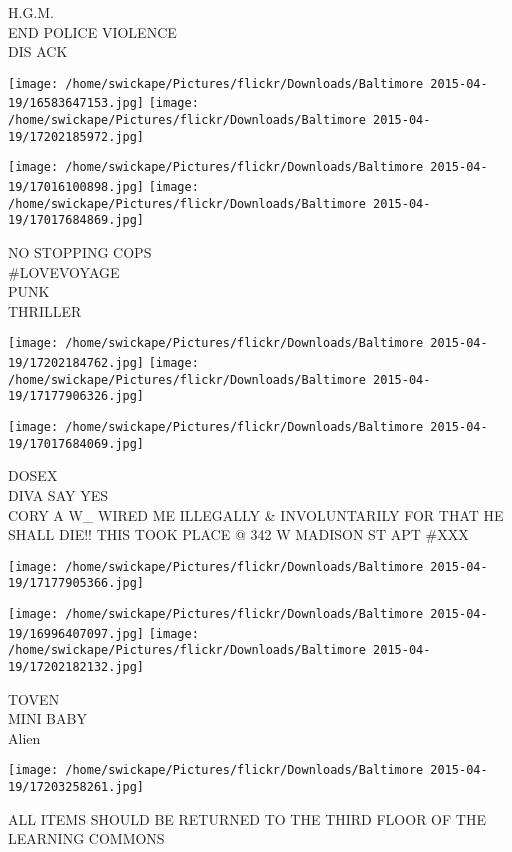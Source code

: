 \documentclass[10pt,letterpaper]{article}
\begin{document}
H.G.M.\\
END POLICE VIOLENCE\\
DIS ACK
\pagebreak

\texttt{[image: /home/swickape/Pictures/flickr/Downloads/Baltimore 2015-04-19/16583647153.jpg]}
\texttt{[image: /home/swickape/Pictures/flickr/Downloads/Baltimore 2015-04-19/17202185972.jpg]}

\texttt{[image: /home/swickape/Pictures/flickr/Downloads/Baltimore 2015-04-19/17016100898.jpg]}
\texttt{[image: /home/swickape/Pictures/flickr/Downloads/Baltimore 2015-04-19/17017684869.jpg]}

NO STOPPING COPS\\
\#LOVEVOYAGE\\
PUNK\\
THRILLER
\pagebreak

\texttt{[image: /home/swickape/Pictures/flickr/Downloads/Baltimore 2015-04-19/17202184762.jpg]}
\texttt{[image: /home/swickape/Pictures/flickr/Downloads/Baltimore 2015-04-19/17177906326.jpg]}

\vspace{0.25in}
\texttt{[image: /home/swickape/Pictures/flickr/Downloads/Baltimore 2015-04-19/17017684069.jpg]}

DOSEX\\
DIVA SAY YES\\
CORY A W\_ WIRED ME ILLEGALLY \& INVOLUNTARILY FOR THAT HE SHALL DIE!! THIS TOOK PLACE @ 342 W MADISON ST APT \#XXX
\pagebreak

\texttt{[image: /home/swickape/Pictures/flickr/Downloads/Baltimore 2015-04-19/17177905366.jpg]}

\vspace{0.25in}
\texttt{[image: /home/swickape/Pictures/flickr/Downloads/Baltimore 2015-04-19/16996407097.jpg]}
\texttt{[image: /home/swickape/Pictures/flickr/Downloads/Baltimore 2015-04-19/17202182132.jpg]}

TOVEN\\
MINI BABY\\
Alien
\pagebreak

\texttt{[image: /home/swickape/Pictures/flickr/Downloads/Baltimore 2015-04-19/17203258261.jpg]}

ALL ITEMS SHOULD BE RETURNED TO THE THIRD FLOOR OF THE LEARNING COMMONS
\pagebreak
\end{document}

